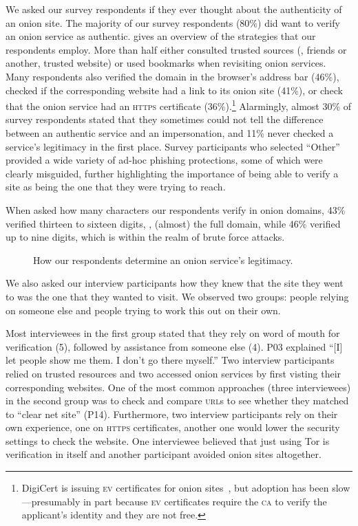 We asked our survey respondents if they ever thought about the authenticity of
an onion site.  The majority of our survey respondents (80\%) did want to verify
an onion service as authentic.   gives an
overview of the strategies that our respondents employ.  More than half either
consulted trusted sources (\eg, friends or another, trusted website) or used
bookmarks when revisiting onion services.  Many respondents also verified the
domain in the browser's address bar (46\%), checked if the corresponding website
had a link to its onion site (41\%), or check that the onion service had an
\textsc{https} certificate (36\%).\footnote{DigiCert is issuing \textsc{ev}
certificates for onion sites~\cite{DigiCert2015a}, but adoption has been
slow---presumably in part because \textsc{ev} certificates require the
\textsc{ca} to verify the applicant's identity and they are not free.}
Alarmingly, almost 30\% of survey respondents stated that they sometimes could
not tell the difference between an authentic service and an impersonation, and
11\% never checked a service's legitimacy in the first place.  Survey
participants who selected ``Other'' provided a wide variety of ad-hoc phishing
protections, some of which were clearly misguided,  further highlighting the importance of being able to verify a
site as being the one that they were trying to reach.

When asked how many characters our respondents verify in onion domains,  43\%
verified thirteen to sixteen digits, \ie, (almost) the full domain, while 46\%
verified up to nine digits, which is within the realm of brute force attacks.

\begin{figure}[t]
    \centering
    
    \caption{How our respondents determine an onion service's legitimacy.}
    \label{fig:determining-legitimacy}
\end{figure}

We also asked our interview participants how they knew that the site they went
to was the one that they wanted to visit.  We observed two groups: people
relying on someone else and people trying to work this out on their own.

Most interviewees in the first group stated that they rely on word of mouth for
verification (5), followed by assistance from someone else (4).  P03 explained
``[I] let people show me them.  I don't go there myself.''  Two interview
participants relied on trusted resources
and two accessed onion services by first visting their corresponding websites.
One of the most common approaches (three interviewees) in the second group was
to check and compare \textsc{url}s to see whether they matched to ``clear net
site'' (P14).  Furthermore, two interview participants rely on their own
experience, one on \textsc{https} certificates, another one would lower the
security settings to check the website.
One interviewee believed that just using Tor is verification in itself and
another participant avoided onion sites altogether.

